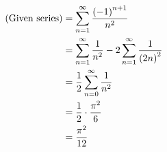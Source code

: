 \item

\begin{align*}
	(\text{Given series})
	&= \sum_{n = 1}^\infty \frac{{(-1)}^{n + 1}}{n^2} \\
	&= \sum_{n = 1}^\infty \frac{1}{n^2} - 2 \sum_{n = 1}^\infty \frac{1}{{(2n)}^2} \\
	&= \frac{1}{2} \sum_{n = 0}^\infty \frac{1}{n^2} \\
	&= \frac{1}{2} \cdot \frac{\pi^2}{6} \\
	&= \frac{\pi^2}{12}
\end{align*}
